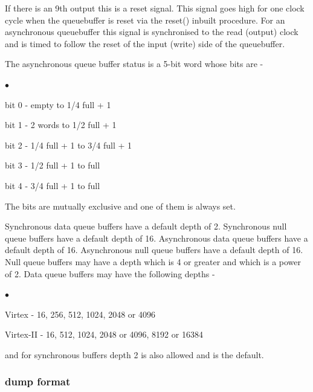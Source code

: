 \documentclass[10pt,a4paper,twoside,fleqn]{book}
\newcommand{\blist}{\begin{list}{$\bullet$}{\setlength{\itemsep}{-5pt}\setlength{\topsep}{-5pt}}}
\newcommand{\blend}{\end{list}}
\begin{document}
                    If there is an 9th output this is a reset signal. This
                    signal goes high for one clock cycle when the queuebuffer is
                    reset via the reset() inbuilt procedure. For an asynchronous
                    queuebuffer this signal is synchronised to the read (output)
                    clock and is timed to follow the reset of the input (write)
                    side of the queuebuffer.

                    The asynchronous queue buffer status is a 5-bit word
                    whose bits are -
                    \blist
                    \item   bit 0 - empty to 1/4 full + 1    
                    \item   bit 1 - 2 words to 1/2 full  + 1  
                    \item   bit 2 - 1/4 full + 1 to 3/4 full  + 1
                    \item   bit 3 - 1/2 full + 1 to full     
                    \item   bit 4 - 3/4 full + 1 to full     
                    \blend
                    The bits are mutually exclusive and one of them is always set.


                    Synchronous data queue buffers have a default depth of 2.
                    Synchronous null queue buffers have a default depth of 16.
                    Asynchronous data queue buffers have a default depth of 16.
                    Asynchronous null queue buffers have a default depth of 16. Null
                    queue buffers may have a depth which is 4 or greater and which is
                    a power of 2. Data queue buffers may have the following depths -
                    \blist
                    \item   Virtex - 16, 256, 512, 1024, 2048 or 4096
                    \item   Virtex-II - 16, 512, 1024, 2048 or 4096, 8192 or 16384
                    \blend
                    and for synchronous buffers depth 2 is also allowed and is
                    the default.

                \subsubsection{dump format}
\end{document}
